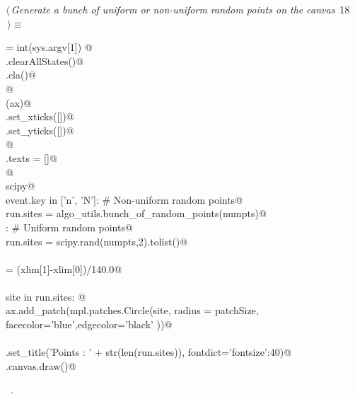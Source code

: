 \documentclass[12pt]{report}
\begin{document}
\begin{flushleft} \small\label{scrap6}\raggedright\small
{} $\langle\,${\itshape Generate a bunch of uniform or non-uniform random points on the canvas}\nobreak\ {\footnotesize {18}}$\,\rangle\equiv$
\vspace{-1ex}
\begin{list}{}{} \item
\mbox{}\verb@numpts = int(sys.argv[1]) @\\
\mbox{}\verb@run.clearAllStates()@\\
\mbox{}\verb@ax.cla()@\\
\mbox{}\verb@               @\\
\mbox{}\verb@applyAxCorrection(ax)@\\
\mbox{}\verb@ax.set_xticks([])@\\
\mbox{}\verb@ax.set_yticks([])@\\
\mbox{}\verb@                @\\
\mbox{}\verb@fig.texts = []@\\
\mbox{}\verb@                 @\\
\mbox{}\verb@import scipy@\\
\mbox{}\verb@if event.key in ['n', 'N']: # Non-uniform random points@\\
\mbox{}\verb@        run.sites = algo_utils.bunch_of_random_points(numpts)@\\
\mbox{}\verb@else : # Uniform random points@\\
\mbox{}\verb@        run.sites = scipy.rand(numpts,2).tolist()@\\
\mbox{}\verb@@\\
\mbox{}\verb@patchSize  = (xlim[1]-xlim[0])/140.0@\\
\mbox{}\verb@@\\
\mbox{}\verb@for site in run.sites:      @\\
\mbox{}\verb@    ax.add_patch(mpl.patches.Circle(site, radius = patchSize, \@\\
\mbox{}\verb@                 facecolor='blue',edgecolor='black' ))@\\
\mbox{}\verb@@\\
\mbox{}\verb@ax.set_title('Points : ' + str(len(run.sites)), fontdict={'fontsize':40})@\\
\mbox{}\verb@fig.canvas.draw()@\\
\mbox{}\verb@@{\NWsep}
\end{list}
\vspace{-1.5ex}
\footnotesize
\begin{list}{}{\setlength{\itemsep}{-\parsep}\setlength{\itemindent}{-\leftmargin}}
\item \NWtxtMacroRefIn\ .

\item{}
\end{list}
\vspace{4ex}
\end{flushleft}
\newchunk 
\end{document}
